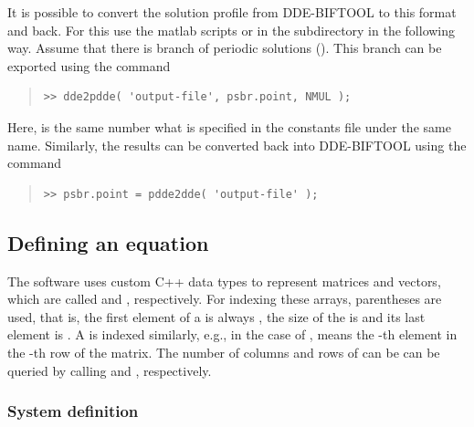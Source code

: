 \documentclass[10pt,a4paper]{ddedoc}
\begin{document}
It is possible to convert the solution profile from DDE-BIFTOOL to this format
and back. For this use the matlab scripts  or
 in the  subdirectory in the following way.
Assume that there is branch of periodic solutions (). This branch can
be exported using the command
{ \small \begin{quote} \begin{lstlisting}[frame=single]
>> dde2pdde( 'output-file', psbr.point, NMUL );
\end{lstlisting} \end{quote} } \noindent
Here,  is the same number what is specified in the constants file
under the same name.
Similarly, the results can be converted back into DDE-BIFTOOL using the command
{ \small \begin{quote} \begin{lstlisting}[frame=single]
>> psbr.point = pdde2dde( 'output-file' );
\end{lstlisting} \end{quote} } \noindent

\subsection{Defining an equation}

The software uses custom C++ data types to represent matrices and vectors,
which are called  and , respectively. For indexing
these arrays, parentheses are used, that is, the first element of a
  is always , the size of the  is
 and its last
element is . A  is indexed similarly, e.g., in
the case of ,  means the -th element in the
-th row of the matrix. The number of columns and rows of  can
be can be queried by calling  and , respectively.

\subsubsection{System definition}\label{sysdef}
\end{document}
